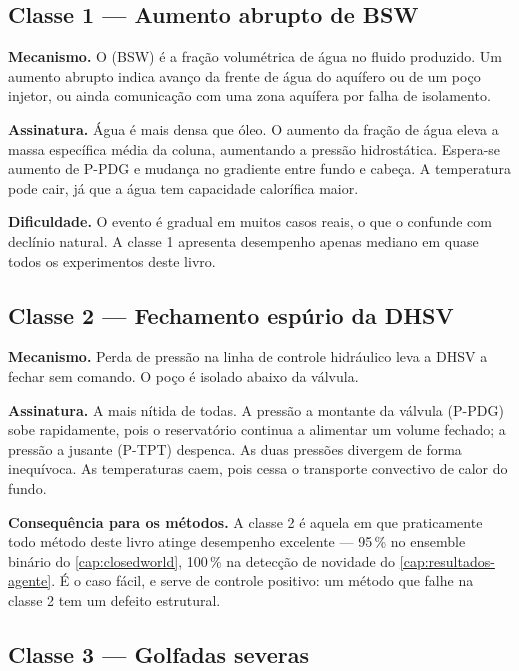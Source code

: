 \subsection{Classe 1 --- Aumento abrupto de BSW}

\textbf{Mecanismo.} O  (BSW)
é a fração volumétrica de água no fluido produzido. Um aumento abrupto indica avanço
da frente de água do aquífero ou de um poço injetor, ou ainda comunicação com uma zona
aquífera por falha de isolamento.

\textbf{Assinatura.} Água é mais densa que óleo. O aumento da fração de água eleva a
massa específica média da coluna, aumentando a pressão hidrostática. Espera-se aumento
de P-PDG e mudança no gradiente entre fundo e cabeça. A temperatura pode cair, já que a
água tem capacidade calorífica maior.

\textbf{Dificuldade.} O evento é gradual em muitos casos reais, o que o confunde com
declínio natural. A classe 1 apresenta desempenho apenas mediano em quase todos os
experimentos deste livro.

\subsection{Classe 2 --- Fechamento espúrio da DHSV}

\textbf{Mecanismo.} Perda de pressão na linha de controle hidráulico leva a DHSV a
fechar sem comando. O poço é isolado abaixo da válvula.

\textbf{Assinatura.} A mais nítida de todas. A pressão a montante da válvula (P-PDG)
sobe rapidamente, pois o reservatório continua a alimentar um volume fechado; a pressão
a jusante (P-TPT) despenca. As duas pressões divergem de forma inequívoca. As
temperaturas caem, pois cessa o transporte convectivo de calor do fundo.

\textbf{Consequência para os métodos.} A classe 2 é aquela em que praticamente todo
método deste livro atinge desempenho excelente --- 95\,\% no ensemble binário do
\cref{cap:closedworld}, 100\,\% na detecção de novidade do \cref{cap:resultados-agente}.
É o caso fácil, e serve de controle positivo: um método que falhe na classe 2 tem um
defeito estrutural.

\subsection{Classe 3 --- Golfadas severas}

